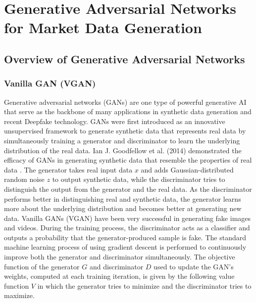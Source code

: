 \chapter{Generative Adversarial Networks for Market Data Generation}

\section{Overview of Generative Adversarial Networks}
\subsection{Vanilla GAN (VGAN)}
Generative adversarial networks (GANs) are one type of powerful generative AI that serve as the backbone of many applications in synthetic data generation and recent Deepfake technology. GANs were first introduced as an innovative unsupervised framework to generate synthetic data that represents real data by simultaneously training a generator and discriminator to learn the underlying distribution of the real data. Ian J. Goodfellow et al. (2014) demonstrated the efficacy of GANs in generating synthetic data that resemble the properties of real data \cite{gans}. The generator takes real input data $x$ and adds Gaussian-distributed random noise $z$ to output synthetic data, while the discriminator tries to distinguish the output from the generator and the real data. As the discriminator performs better in distinguishing real and synthetic data, the generator learns more about the underlying distribution and becomes better at generating new data. Vanilla GANs (VGAN) have been very successful in generating fake images and videos. During the training process, the discriminator acts as a classifier and outputs a probability that the generator-produced sample is fake. The standard machine learning process of using gradient descent is performed to continuously improve both the generator and discriminator simultaneously. The objective function of the generator $G$ and discriminator $D$ used to update the GAN's weights, computed at each training iteration, is given by the following value function $V$ in which the generator tries to minimize and the discriminator tries to maximize.
